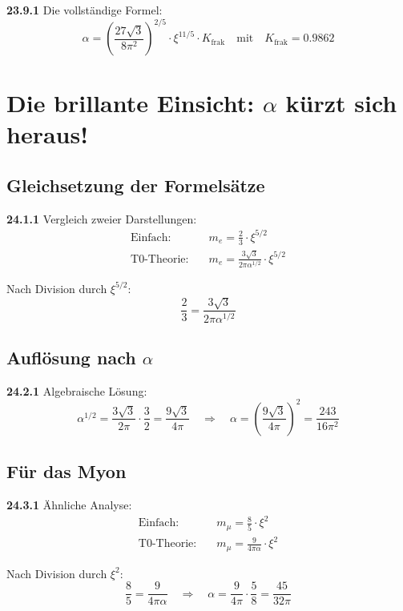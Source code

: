 \documentclass[12pt,a4paper]{article}
\begin{document}
\noindent \textbf{23.9.1} Die vollständige Formel:
\[
\boxed{
	\alpha = \left(\frac{27\sqrt{3}}{8\pi^2}\right)^{2/5} \cdot \xi^{11/5} \cdot K_{\text{frak}}
}
\quad \text{mit} \quad K_{\text{frak}} = 0.9862
\]	


\section{Die brillante Einsicht: $\alpha$ kürzt sich heraus!}

\subsection{Gleichsetzung der Formelsätze}

\noindent \textbf{24.1.1} Vergleich zweier Darstellungen:
\begin{align*}
	\text{Einfach:} &\quad m_e = \frac{2}{3} \cdot \xi^{5/2} \\
	\text{T0-Theorie:} &\quad m_e = \frac{3\sqrt{3}}{2\pi\alpha^{1/2}} \cdot \xi^{5/2}
\end{align*}

Nach Division durch $\xi^{5/2}$:
\[
\frac{2}{3} = \frac{3\sqrt{3}}{2\pi\alpha^{1/2}}
\]

\subsection{Auflösung nach $\alpha$}

\noindent \textbf{24.2.1} Algebraische Lösung:
\[
\alpha^{1/2} = \frac{3\sqrt{3}}{2\pi} \cdot \frac{3}{2} = \frac{9\sqrt{3}}{4\pi}
\quad \Rightarrow \quad
\alpha = \left(\frac{9\sqrt{3}}{4\pi}\right)^2 = \frac{243}{16\pi^2}
\]

\subsection{Für das Myon}

\noindent \textbf{24.3.1} Ähnliche Analyse:
\begin{align*}
	\text{Einfach:} &\quad m_\mu = \frac{8}{5} \cdot \xi^2 \\
	\text{T0-Theorie:} &\quad m_\mu = \frac{9}{4\pi\alpha} \cdot \xi^2
\end{align*}

Nach Division durch $\xi^2$:
\[
\frac{8}{5} = \frac{9}{4\pi\alpha}
\quad \Rightarrow \quad
\alpha = \frac{9}{4\pi} \cdot \frac{5}{8} = \frac{45}{32\pi}
\]
\end{document}
